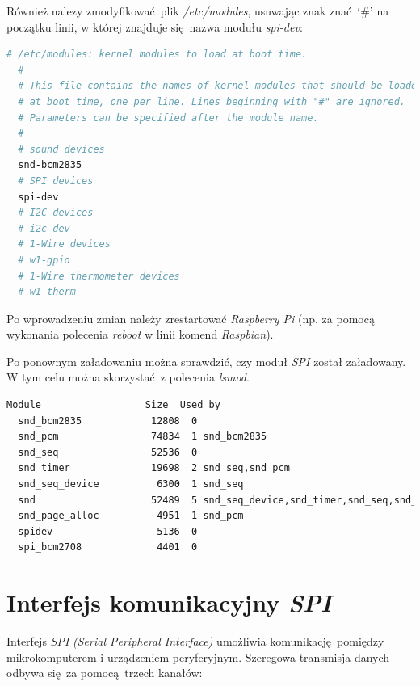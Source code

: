 \documentclass[eng,printmode]{mgr}
\begin{document}
Również nalezy zmodyfikować plik \emph{/etc/modules}, usuwając znak znać `\#' na początku linii, w której znajduje się nazwa modułu \emph{spi-dev}:
\vspace{0.5cm}

\begin{minipage}{\textwidth}
  \begin{lstlisting}[language=bash,frame=single,caption={Zmodyfikowany plik \emph{/etc/modules}}]
  # /etc/modules: kernel modules to load at boot time.  
  #  
  # This file contains the names of kernel modules that should be loaded  
  # at boot time, one per line. Lines beginning with "#" are ignored.  
  # Parameters can be specified after the module name.  
  #  
  # sound devices  
  snd-bcm2835  
  # SPI devices  
  spi-dev  
  # I2C devices  
  # i2c-dev  
  # 1-Wire devices  
  # w1-gpio  
  # 1-Wire thermometer devices  
  # w1-therm 
  \end{lstlisting} 
\end{minipage}

Po wprowadzeniu zmian należy zrestartować \emph{Raspberry Pi} (np. za pomocą wykonania polecenia \emph{reboot} w linii komend \emph{Raspbian}). 

Po ponownym załadowaniu można sprawdzić, czy moduł \emph{SPI} został załadowany. W tym celu można skorzystać z polecenia \emph{lsmod}.
\vspace{0.5cm}

\begin{minipage}{\textwidth}
  \begin{lstlisting}[language=bash,frame=single,caption={Wynik wykonania polecenia \emph{lsmod}}]
  Module                  Size  Used by
  snd_bcm2835            12808  0
  snd_pcm                74834  1 snd_bcm2835
  snd_seq                52536  0
  snd_timer              19698  2 snd_seq,snd_pcm
  snd_seq_device          6300  1 snd_seq
  snd                    52489  5 snd_seq_device,snd_timer,snd_seq,snd_pcm,snd_bcm2835
  snd_page_alloc          4951  1 snd_pcm
  spidev                  5136  0
  spi_bcm2708             4401  0
  \end{lstlisting} 
\end{minipage}

\section{Interfejs komunikacyjny \emph{SPI}}

Interfejs \emph{SPI} \emph{(Serial Peripheral Interface)} umożliwia komunikację pomiędzy mikrokomputerem i urządzeniem peryferyjnym. Szeregowa transmisja danych odbywa się za pomocą trzech kanałów:
\end{document}
